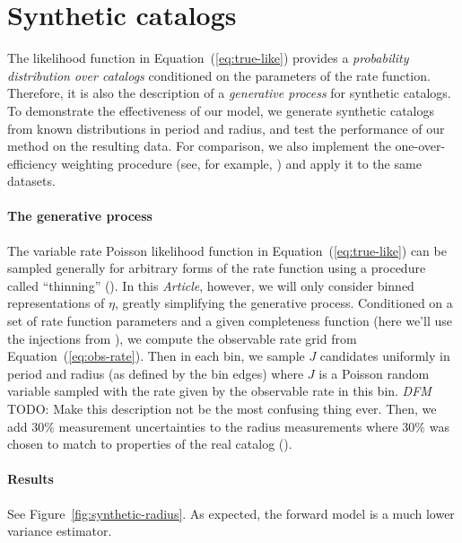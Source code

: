 \documentclass[12pt,preprint]{aastex}
\newcommand{\paper}{\emph{Article}}
\newcommand{\Fig}[1]{Figure~\ref{fig:#1}}
\newcommand{\fig}[1]{\Fig{#1}}
\newcommand{\Eq}[1]{Equation~(\ref{eq:#1})}
\newcommand{\eq}[1]{\Eq{#1}}
\newcommand{\todo}[3]{{\color{#2} \emph{#1} TODO: #3}}
\newcommand{\dfmtodo}[1]{\todo{DFM}{red}{#1}}
\newcommand{\rate}{\ensuremath{\eta}}
\begin{document}
\section{Synthetic catalogs}

The likelihood function in \eq{true-like} provides a \emph{probability
distribution over catalogs} conditioned on the parameters of the rate
function.
Therefore, it is also the description of a \emph{generative process} for
synthetic catalogs.
To demonstrate the effectiveness of our model, we generate synthetic catalogs
from known distributions in period and radius, and test the performance of our
method on the resulting data.
For comparison, we also implement the one-over-efficiency weighting procedure
(see, for example, \citealt{howard, dressing, petigura}) and apply it to the
same datasets.

\paragraph{The generative process}
The variable rate Poisson likelihood function in \eq{true-like} can be sampled
generally for arbitrary forms of the rate function using a procedure called
``thinning'' (\citealt{poisson}).
In this \paper, however, we will only consider binned representations of
\rate, greatly simplifying the generative process.
Conditioned on a set of rate function parameters and a given completeness
function (here we'll use the injections from \citealt{petigura}), we compute
the observable rate grid from \eq{obs-rate}.
Then in each bin, we sample $J$ candidates uniformly in period and
radius (as defined by the bin edges) where $J$ is a Poisson random variable
sampled with the rate given by the observable rate in this bin.
\dfmtodo{Make this description not be the most confusing thing ever.}
Then, we add 30\% measurement uncertainties to the radius measurements where
30\% was chosen to match to properties of the real catalog
(\citealt{petigura}).

\paragraph{Results}
See \fig{synthetic-radius}.
As expected, the forward model is a much lower variance estimator.
\end{document}
